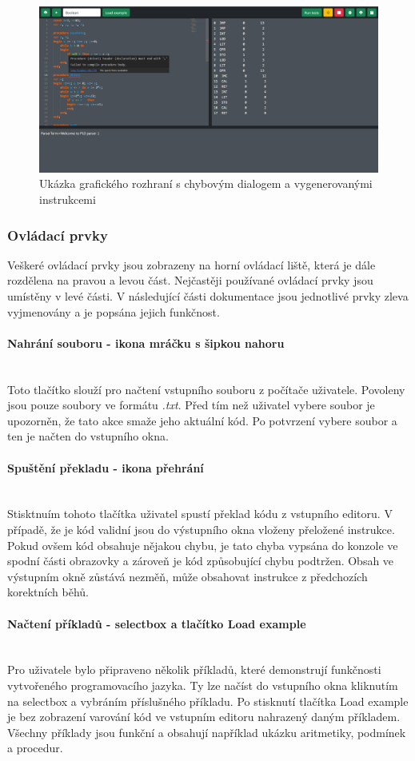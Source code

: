 \documentclass[12pt, letterpaper]{article}
\newcommand{\myparagraph}[1]{\paragraph{#1}\mbox{}\\}
\begin{document}
\begin{figure}[H]
	\centering
	\includegraphics[width=\linewidth]{img/gui.png}
	\caption{Ukázka grafického rozhraní s chybovým dialogem a vygenerovanými instrukcemi}
	\label{fig:GUI}
\end{figure}

\subsubsection{Ovládací prvky}
Veškeré ovládací prvky jsou zobrazeny na horní ovládací liště, která je dále rozdělena na pravou a levou část. Nejčastěji používané ovládací prvky jsou umístěny v levé části. V následující části dokumentace jsou jednotlivé prvky zleva vyjmenovány a je popsána jejich funkčnost.

\myparagraph{Nahrání souboru - ikona mráčku s šipkou nahoru}
Toto tlačítko slouží pro načtení vstupního souboru z počítače uživatele. Povoleny jsou pouze soubory ve formátu \textit{.txt}. Před tím než uživatel vybere soubor je upozorněn, že tato akce smaže jeho aktuální kód. Po potvrzení vybere  soubor a ten je načten do vstupního okna.

\myparagraph{Spuštění překladu - ikona přehrání}
Stisktnuím tohoto tlačítka uživatel spustí překlad kódu z vstupního editoru. V případě, že je kód validní jsou do výstupního okna vloženy přeložené instrukce. Pokud ovšem kód obsahuje nějakou chybu, je tato chyba vypsána do konzole ve spodní části obrazovky a zároveň je kód způsobující chybu podtržen. Obsah ve výstupním okně zůstává nezměň, může obsahovat instrukce z předchozích korektních běhů.

\myparagraph{Načtení příkladů - selectbox a tlačítko Load example}
Pro uživatele bylo připraveno několik příkladů, které demonstrují funkčnosti vytvořeného programovacího jazyka. Ty lze načíst do vstupního okna kliknutím na selectbox a vybráním příslušného příkladu. Po stisknutí tlačítka Load example je bez zobrazení varování kód ve vstupním editoru nahrazený daným příkladem. Všechny příklady jsou funkční a obsahují například ukázku aritmetiky, podmínek a procedur.
\end{document}
